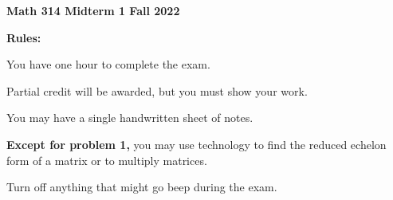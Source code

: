 \documentclass[12pt]{article}
\renewcommand{\emph}[1]{\textsf{\textbf{#1}}}
\begin{document}
{\emph{\fontsize{26}{28}\selectfont Math 314\hfill
{\fontsize{32}{36}\selectfont Midterm 1}
\hfill Fall 2022}}
\vskip 2cm
\strut\vtop{\halign{\emph#\hskip 0.5em\hfil&#\hbox to 2in{\hrulefill}\cr
\emph{\fontsize{18}{22}\selectfont Name:}&\cr
\noalign{\vskip 10pt}
}}
%
\vfill
{\fontsize{18}{22}\selectfont\emph{Rules:}}

You have one hour to complete the exam. 

Partial credit will be awarded, but you must show your work.

You may have a single handwritten sheet of notes.

\textbf{Except for problem 1,} you may use technology to find the reduced echelon form of a matrix or to multiply matrices. 




Turn off anything that might go beep during the exam.
\end{document}
